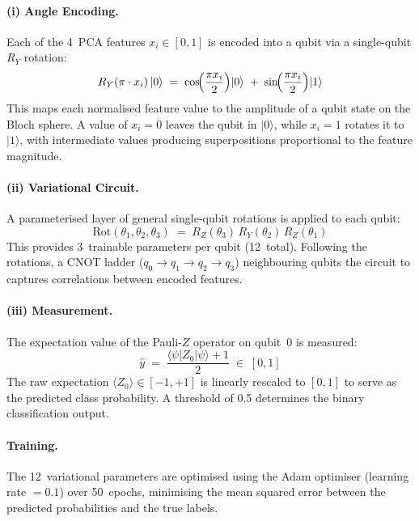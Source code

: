 \documentclass[runningheads]{llncs}
\begin{document}
\paragraph{(i) Angle Encoding.}
Each of the 4~PCA features $x_i \in [0,1]$ is encoded into a qubit via a single-qubit $R_Y$ rotation:
\begin{equation}
R_Y(\pi \cdot x_i)\,|0\rangle \;=\; \cos\!\Bigl(\frac{\pi x_i}{2}\Bigr)|0\rangle \;+\; \sin\!\Bigl(\frac{\pi x_i}{2}\Bigr)|1\rangle
\label{eq:angle_encoding}
\end{equation}
This maps each normalised feature value to the amplitude of a qubit state on the Bloch sphere. A value of $x_i = 0$ leaves the qubit in $|0\rangle$, while $x_i = 1$ rotates it to $|1\rangle$, with intermediate values producing superpositions proportional to the feature magnitude.

\paragraph{(ii) Variational Circuit.}
A parameterised layer of general single-qubit rotations is applied to each qubit:
\begin{equation}
\text{Rot}(\theta_1, \theta_2, \theta_3) \;=\; R_Z(\theta_3)\,R_Y(\theta_2)\,R_Z(\theta_1)
\end{equation}
This provides 3~trainable parameters per qubit (12~total). Following the rotations, a CNOT ladder ($q_0 \!\to\! q_1 \!\to\! q_2 \!\to\! q_3$) neighbouring qubits the circuit to captures correlations between encoded features.

\paragraph{(iii) Measurement.}
The expectation value of the Pauli-$Z$ operator on qubit~0 is measured:
\begin{equation}
\hat{y} \;=\; \frac{\langle\psi|Z_0|\psi\rangle + 1}{2} \;\in\; [0,1]
\end{equation}
The raw expectation $\langle Z_0\rangle \in [-1, +1]$ is linearly rescaled to $[0,1]$ to serve as the predicted class probability. A threshold of 0.5 determines the binary classification output.

\paragraph{Training.}
The 12~variational parameters are optimised using the Adam optimiser (learning rate $= 0.1$) over 50~epochs, minimising the mean squared error between the predicted probabilities and the true labels.
\end{document}

